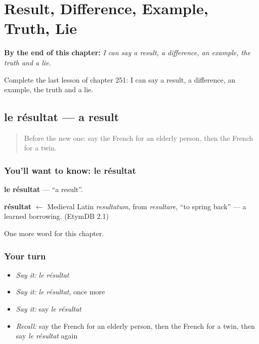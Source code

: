 
\chapter{Result, Difference, Example, Truth, Lie}
\label{ch:fr-result-difference-example-truth-lie}

\begin{chapteropening}
\textbf{By the end of this chapter:} \emph{I can say a result, a difference, an example, the truth and a lie.}

Complete the last lesson of chapter 251: I can say a result, a difference, an example, the truth and a lie.
\end{chapteropening}

\section[le résultat]{le résultat — a result}

\label{lesson:FR-C251-resultat}



\begin{quote}
Before the new one: say the French for an elderly person, then the French for a twin.
\end{quote}

\subsection*{You'll want to know: le résultat}
\textbf{le résultat} — \textquotedblleft{}a result\textquotedblright{}.

\begin{cousinweb}
\textbf{résultat} $\leftarrow$ Medieval Latin \emph{resultatum}, from \emph{resultare}, \textquotedblleft{}to spring back\textquotedblright{} — a learned borrowing. (EtymDB 2.1)
\end{cousinweb}

\begin{grammarlens}[title={What you've built}]
One more word for this chapter.
\end{grammarlens}

\subsection*{Your turn}
\begin{itemize}
\raggedright
  \item \emph{Say it:} \emph{le résultat}
  \item \emph{Say it:} \emph{le résultat}, once more
  \item \emph{Say it:} say \emph{le résultat}
  \item \emph{Recall:} say the French for an elderly person, then the French for a twin, then say \emph{le résultat} again
\end{itemize}

